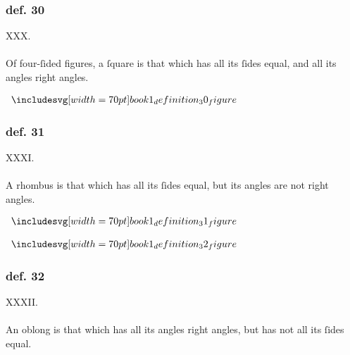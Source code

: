 \hfill

\begin{minipage}{0.67\textwidth}
    \subsubsection{def. 30}
    \begin{center}
        XXX.\label{book1def30}\\
        \hfill\\
        Of four-ſided figures, a ſquare is that which has all its ſides equal, and all its angles right angles.
    \end{center}
\end{minipage}%
\begin{minipage}{0.33\textwidth}
    \begin{center}
        $\img[0][0][70]{book1_definition_30_figure}$
    \end{center}
\end{minipage}

\hfill

\begin{minipage}{0.67\textwidth}
    \subsubsection{def. 31}
    \begin{center}
        XXXI.\label{book1def31}\\
        \hfill\\
        A rhombus is that which has all its ſides equal, but its angles are not right angles.
    \end{center}
\end{minipage}%
\begin{minipage}{0.33\textwidth}
    \begin{center}
        $\img[0][0][70]{book1_definition_31_figure}$
    \end{center}
\end{minipage}

\hfill

\begin{minipage}{0.33\textwidth}
    \begin{center}
        $\img[0][0][70]{book1_definition_32_figure}$
    \end{center}
\end{minipage}%
\begin{minipage}{0.67\textwidth}
    \subsubsection{def. 32}
    \begin{center}
        XXXII.\label{book1def32}\\
        \hfill\\
        An oblong is that which has all its angles right angles, but has not all its ſides equal.
    \end{center}
\end{minipage}

